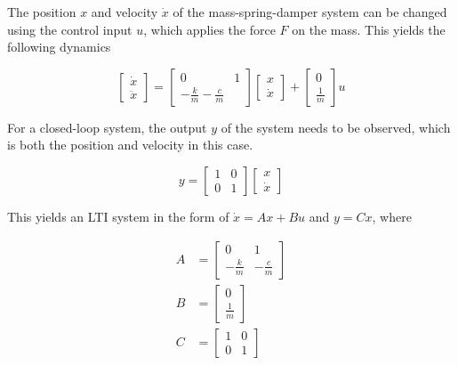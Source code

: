 \documentclass{article}
\begin{document}
The position $x$ and velocity $\dot{x}$ of the mass-spring-damper system can be changed using the control input $u$,
which applies the force $F$ on the mass. This yields the following dynamics

\begin{equation}
  \begin{bmatrix}
    \dot{x} \\
    \ddot{x}
  \end{bmatrix} =
  \begin{bmatrix}
    0 & 1 \\
    -\frac{k}{m}  -\frac{c}{m}
  \end{bmatrix}
  \begin{bmatrix}
    x \\
    \dot{x}
  \end{bmatrix} +
  \begin{bmatrix}
    0 \\
    \frac{1}{m}
  \end{bmatrix} u
\end{equation}

For a closed-loop system, the output $y$ of the system needs to be observed, which is both the position and velocity in this case.

\begin{equation}
  y =
  \begin{bmatrix}
    1 & 0 \\
    0 & 1
  \end{bmatrix}
  \begin{bmatrix}
    x \\
    \dot{x}
  \end{bmatrix}
\end{equation}

This yields an LTI system in the form of $\dot{x} = Ax + Bu$ and $y = Cx$, where

\begin{equation}
  \begin{aligned}
    A &=
    \begin{bmatrix}
      0 & 1 \\
      -\frac{k}{m} & -\frac{c}{m}
    \end{bmatrix} \\
    B &=
    \begin{bmatrix}
      0 \\
      \frac{1}{m}
    \end{bmatrix} \\
    C &=
    \begin{bmatrix}
      1 & 0 \\
      0 & 1
    \end{bmatrix}
  \end{aligned}
\end{equation}
\end{document}
